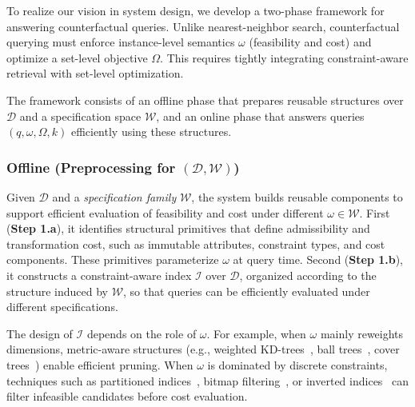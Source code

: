 
To realize our vision in system design, we develop a two-phase framework for answering counterfactual queries. Unlike nearest-neighbor search, counterfactual querying must enforce instance-level semantics $\omega$ (feasibility and cost) and optimize a set-level objective $\Omega$. This requires tightly integrating constraint-aware retrieval with set-level optimization.

The framework consists of an offline phase that prepares reusable structures over $\mathcal D$ and a specification space $\mathcal W$, and an online phase that answers queries $(q,\omega,\Omega,k)$ efficiently using these structures.

\subsubsection{Offline (Preprocessing for $(\mathcal D,\mathcal W)$)}
Given $\mathcal D$ and a \emph{specification family} $\mathcal W$,  the system builds reusable components to support efficient evaluation of feasibility and cost under different $\omega \in \mathcal W$. First (\textbf{Step 1.a}), it identifies structural primitives that define admissibility and transformation cost, such as immutable attributes, constraint types, and cost components. These primitives parameterize $\omega$ at query time. Second (\textbf{Step 1.b}), it constructs a constraint-aware index $\mathcal I$ over $\mathcal D$, organized according to the structure induced by $\mathcal W$, so that queries can be efficiently evaluated under different specifications.

The design of $\mathcal I$ depends on the role of $\omega$. For example, when $\omega$ mainly reweights dimensions, metric-aware structures (e.g., weighted KD-trees~\cite{reif2022scalable}, ball trees~\cite{dolatshah2015ball}, cover trees~\cite{izbicki2015faster}) enable efficient pruning. When $\omega$ is dominated by discrete constraints, techniques such as partitioned indices~\cite{lee2019constraint}, bitmap filtering~\cite{chan1998bitmap}, or inverted indices~\cite{babenko2014inverted} can filter infeasible candidates before cost evaluation.

